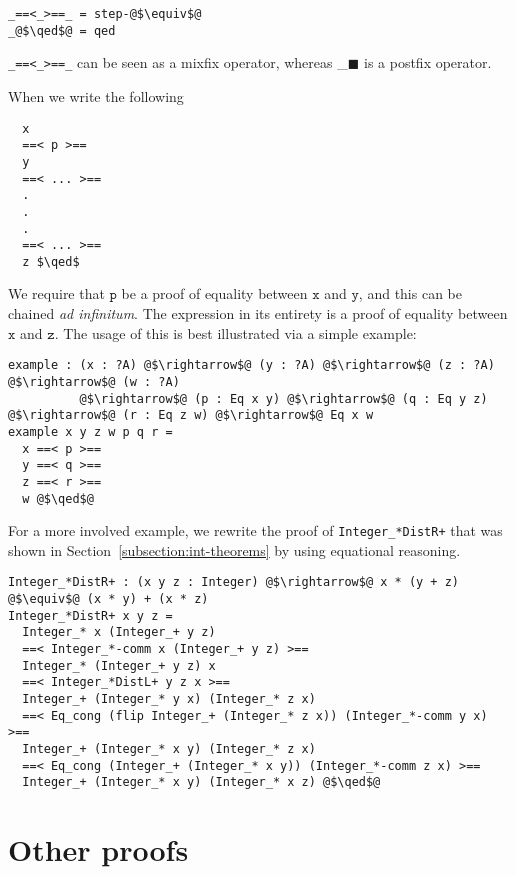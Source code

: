 \documentclass[12pt,twoside,maitrise]{dms}
\theoremstyle{definition}
\numberwithin{equation}{section}
\numberwithin{table}{chapter}
\numberwithin{figure}{chapter}
\newcommand\id[1] {\texttt{#1}}
\newcommand\latinphrase{\textit}
\renewcommand\qed{\blacksquare}
\begin{document}
\begin{verbatim}
_==<_>==_ = step-@$\equiv$@
_@$\qed$@ = qed
\end{verbatim}

\verb|_==<_>==_| can be seen as a mixfix operator, whereas \_$\qed$ is a postfix
operator.

When we write the following

\begin{lstlisting}
  x
  ==< p >==
  y
  ==< ... >==
  .
  .
  .
  ==< ... >==
  z $\qed$
\end{lstlisting}

We require that $\id{p}$ be a proof of equality between $\id{x}$ and $\id{y}$, and this can be chained \latinphrase{ad infinitum}. The expression in its entirety is a proof of equality between $\id{x}$ and $\id{z}$. The usage of this is best illustrated via a simple example:

\begin{verbatim}
example : (x : ?A) @$\rightarrow$@ (y : ?A) @$\rightarrow$@ (z : ?A) @$\rightarrow$@ (w : ?A)
          @$\rightarrow$@ (p : Eq x y) @$\rightarrow$@ (q : Eq y z) @$\rightarrow$@ (r : Eq z w) @$\rightarrow$@ Eq x w
example x y z w p q r =
  x ==< p >==
  y ==< q >==
  z ==< r >==
  w @$\qed$@
\end{verbatim}

For a more involved example, we rewrite the proof of \verb|Integer_*DistR+| that was shown in Section~\ref{subsection:int-theorems} by using equational reasoning.

\begin{verbatim}
Integer_*DistR+ : (x y z : Integer) @$\rightarrow$@ x * (y + z) @$\equiv$@ (x * y) + (x * z)
Integer_*DistR+ x y z =
  Integer_* x (Integer_+ y z)
  ==< Integer_*-comm x (Integer_+ y z) >==
  Integer_* (Integer_+ y z) x
  ==< Integer_*DistL+ y z x >==
  Integer_+ (Integer_* y x) (Integer_* z x)
  ==< Eq_cong (flip Integer_+ (Integer_* z x)) (Integer_*-comm y x) >==
  Integer_+ (Integer_* x y) (Integer_* z x)
  ==< Eq_cong (Integer_+ (Integer_* x y)) (Integer_*-comm z x) >==
  Integer_+ (Integer_* x y) (Integer_* x z) @$\qed$@
\end{verbatim}

\chapter{Other proofs}\label{app:other-proofs}
\end{document}

